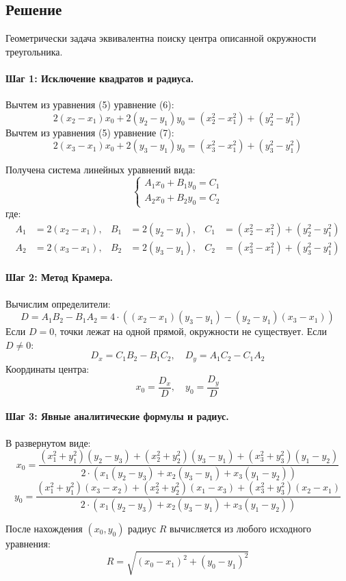 \documentclass[12pt,a4paper]{article}
\begin{document}
\subsection*{Решение}

Геометрически задача эквивалентна поиску центра описанной окружности треугольника.

\paragraph{Шаг 1: Исключение квадратов и радиуса.}
Вычтем из уравнения (5) уравнение (6):
\[
2(x_2 - x_1)x_0 + 2(y_2 - y_1)y_0 = (x_2^2 - x_1^2) + (y_2^2 - y_1^2)
\]
Вычтем из уравнения (5) уравнение (7):
\[
2(x_3 - x_1)x_0 + 2(y_3 - y_1)y_0 = (x_3^2 - x_1^2) + (y_3^2 - y_1^2)
\]

Получена система линейных уравнений вида:
\[
\begin{cases}
A_1 x_0 + B_1 y_0 = C_1 \\
A_2 x_0 + B_2 y_0 = C_2
\end{cases}
\]
где:
\begin{align*}
A_1 &= 2(x_2 - x_1), & B_1 &= 2(y_2 - y_1), & C_1 &= (x_2^2 - x_1^2) + (y_2^2 - y_1^2) \\
A_2 &= 2(x_3 - x_1), & B_2 &= 2(y_3 - y_1), & C_2 &= (x_3^2 - x_1^2) + (y_3^2 - y_1^2)
\end{align*}

\paragraph{Шаг 2: Метод Крамера.}
Вычислим определители:
\[
D = A_1 B_2 - B_1 A_2 = 4 \cdot \left((x_2 - x_1)(y_3 - y_1) - (y_2 - y_1)(x_3 - x_1)\right)
\]
Если $D = 0$, точки лежат на одной прямой, окружности не существует. Если $D \neq 0$:
\[
D_x = C_1 B_2 - B_1 C_2, \quad D_y = A_1 C_2 - C_1 A_2
\]
Координаты центра:
\[
x_0 = \frac{D_x}{D}, \quad y_0 = \frac{D_y}{D}
\]

\paragraph{Шаг 3: Явные аналитические формулы и радиус.}
В развернутом виде:
\begin{equation}
x_0 = \frac{(x_1^2 + y_1^2)(y_2 - y_3) + (x_2^2 + y_2^2)(y_3 - y_1) + (x_3^2 + y_3^2)(y_1 - y_2)}{2 \cdot \left(x_1(y_2 - y_3) + x_2(y_3 - y_1) + x_3(y_1 - y_2)\right)}
\end{equation}
\begin{equation}
y_0 = \frac{(x_1^2 + y_1^2)(x_3 - x_2) + (x_2^2 + y_2^2)(x_1 - x_3) + (x_3^2 + y_3^2)(x_2 - x_1)}{2 \cdot \left(x_1(y_2 - y_3) + x_2(y_3 - y_1) + x_3(y_1 - y_2)\right)}
\end{equation}

После нахождения $(x_0, y_0)$ радиус $R$ вычисляется из любого исходного уравнения:
\begin{equation}
R = \sqrt{(x_0 - x_1)^2 + (y_0 - y_1)^2}
\end{equation}
\end{document}
